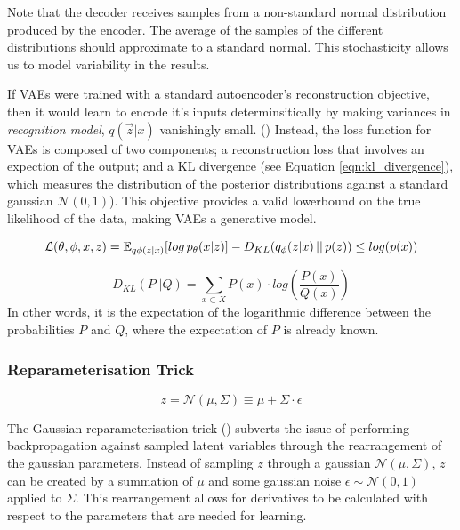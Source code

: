 \documentclass[12pt,twoside]{report}
\begin{document}
Note that the decoder receives samples from a non-standard normal distribution produced by the encoder. The average of the samples of the different distributions should approximate to a standard normal. This stochasticity allows us to model variability in the results. 

If VAEs were trained with a standard autoencoder's reconstruction objective, then it would learn to encode it's inputs determinsitically by making variances in \textit{recognition model}, $q(\overrightarrow{z}|x)$ vanishingly small. (\cite{raiko_techniques_2014}) Instead, the loss function for VAEs is composed of two components; a reconstruction loss that involves an expection of the output; and a KL divergence (see Equation \ref{eqn:kl_divergence}), which measures the distribution of the posterior distributions against a standard gaussian $ \mathcal{N}(0,1)$). This objective provides a valid lowerbound on the true likelihood of the data, making VAEs a generative model.
  
\begin{equation}
	\label{eqn:elbo}
	\mathcal{L}(\theta, \phi, x, z) = \mathbb{E}_{q \phi (z|x)}[log \thinspace p_{\theta}(x|z)] - D_{KL}(q_{\phi}(z|x)\thinspace||\thinspace p(z)) \leq log (p(x))
\end{equation}

\begin{equation}
	\label{eqn:kl_divergence}
D_{KL}(P ||Q) = \sum_{x \subset X} P(x) \cdot log (\frac{P(x)}{Q(x)})
\end{equation}
In other words, it is the expectation of the logarithmic difference between the probabilities $P$ and $Q$, where the expectation of $P$ is already known.

\subsubsection*{Reparameterisation Trick}

$$z = \mathcal{N}(\mu, \Sigma) \equiv \mu + \Sigma \cdot \epsilon $$ 


The Gaussian reparameterisation trick (\cite{kingma_auto-encoding_2013}) subverts the issue of performing backpropagation against sampled latent variables through the rearrangement of the gaussian parameters. Instead of sampling $z$ through a gaussian $\mathcal{N}(\mu, \Sigma)$, $z$ can be created by a summation of $\mu$ and some gaussian noise $\epsilon \sim \mathcal{N}(0,1)$ applied to $\Sigma$. This rearrangement allows for derivatives to be calculated with respect to the parameters that are needed for learning.
\end{document}
